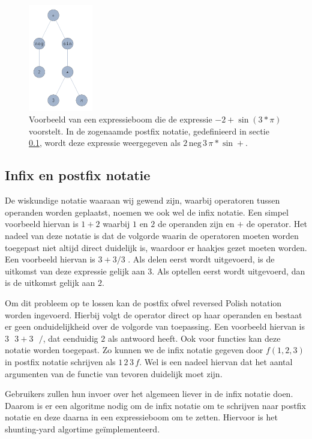 \documentclass[a4paper]{article}
\begin{document}
\begin{figure}[!htb]
	\centering
	\includegraphics[width=0.25\textwidth]{expressionTree}
	\caption{Voorbeeld van een expressieboom die de expressie $-2+\sin(3 * \pi)$ voorstelt. In de zogenaamde postfix notatie, gedefinieerd in sectie \ref{sec:postfix}, wordt deze expressie weergegeven als $2\, \mathrm{neg}\,3\,\pi*\sin +$.} \label{fig:boom}
\end{figure}

\subsection{Infix en postfix notatie}\label{sec:postfix}
De wiskundige notatie waaraan wij gewend zijn, waarbij operatoren tussen operanden worden geplaatst, noemen we ook wel de infix notatie. Een simpel voorbeeld hiervan is $1 + 2$  waarbij $1$ en $2$ de operanden zijn en $+$ de operator. Het nadeel van deze notatie is dat de volgorde waarin de operatoren moeten worden toegepast niet altijd direct duidelijk is, waardoor er haakjes gezet moeten worden. Een voorbeeld hiervan is $3+3 / 3$ . Als delen eerst wordt uitgevoerd, is de uitkomst van deze expressie gelijk aan $3$. Als optellen eerst wordt uitgevoerd, dan is de uitkomst gelijk aan $2$. 

Om dit probleem op te lossen kan de postfix ofwel reversed Polish notation worden ingevoerd. Hierbij volgt de operator direct op haar operanden en bestaat er geen onduidelijkheid over de volgorde van toepassing. Een voorbeeld hiervan is $3\text{ } 3 + 3 \text{ } /$, dat eenduidig $2$ als antwoord heeft. Ook voor functies kan deze notatie worden toegepast. Zo kunnen we de infix notatie gegeven door $f(1,2,3)$ in postfix notatie schrijven als $1\,2\,3\,f$. Wel is een  nadeel hiervan dat het aantal argumenten van de functie van tevoren duidelijk moet zijn.

Gebruikers zullen hun invoer over het algemeen liever in de infix notatie doen. Daarom is er een algoritme nodig om de infix notatie om te schrijven naar postfix notatie en deze daarna in een expressieboom om te zetten. Hiervoor is het shunting-yard algortime ge\"implementeerd.
\end{document}
